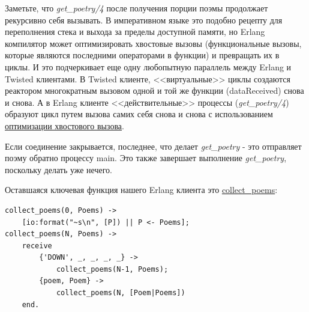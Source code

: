 
Заметьте, что \textit{get\_poetry/4} после получения порции поэмы 
продолжает рекурсивно себя вызывать. В императивном языке это подобно 
рецепту для переполнения стека и выхода за пределы доступной памяти, но 
Erlang компилятор может оптимизировать хвостовые вызовы (функциональные 
вызовы, которые являются последними операторами в функции) и превращать их 
в циклы. И это подчеркивает еще одну любопытную параллель между Erlang и 
Twisted клиентами. В Twisted клиенте, <<виртуальные>> циклы создаются 
реактором многократным вызовом одной и той же функции (dataReceived) снова и снова. 
А в Erlang клиенте <<действительные>> процессы (\textit{get\_poetry/4}) 
образуют цикл путем вызова самих себя снова и снова с использованием 
\href{http://stackoverflow.com/questions/310974/what-is-tail-call-optimization}{оптимизации хвостового вызова}.



Если соединение закрывается, последнее, что делает \textit{get\_poetry} - 
это отправляет поэму обратно процессу main. Это также завершает выполнение 
\textit{get\_poetry}, поскольку делать уже нечего.


Оставшаяся ключевая функция нашего Erlang клиента это 
\href{http://github.com/jdavisp3/twisted-intro/blob/master/erlang-client-1/get-poetry#L58}{collect\_poems}:

\begin{scriptsize}\begin{verbatim}
collect_poems(0, Poems) ->
    [io:format("~s\n", [P]) || P <- Poems];
collect_poems(N, Poems) ->
    receive
        {'DOWN', _, _, _, _} ->
            collect_poems(N-1, Poems);
        {poem, Poem} ->
            collect_poems(N, [Poem|Poems])
    end.
\end{verbatim}\end{scriptsize}


